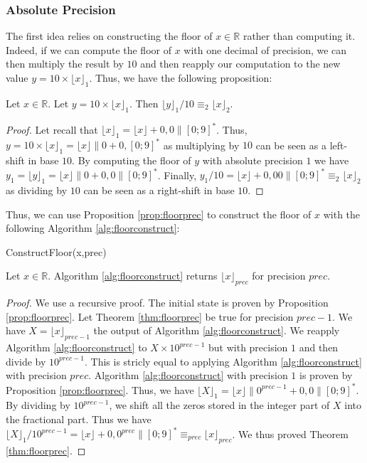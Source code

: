 \documentclass[runningheads]{llncs}
\begin{document}
\subsubsection{Absolute Precision} 
The first idea relies on constructing the floor of $x\in\mathbb{R}$ rather than computing it. Indeed, if we can compute the floor of $x$ with one decimal of precision, we can then multiply the result by $10$ and then reapply our computation to the new value $y=10\times \lfloor x\rfloor_1$. Thus, we have the following proposition:
\begin{proposition}\label{prop:floorprec}
  Let $x\in\mathbb{R}$. Let $y = 10\times\lfloor x\rfloor_1$. Then $\lfloor y \rfloor_1 /10 \equiv_2 \lfloor x \rfloor_2$.
\end{proposition}
\begin{proof}
  Let recall that $\lfloor x \rfloor_1 = \lfloor x \rfloor + 0,0 \|[0;9]^*$. Thus, $y=10\times\lfloor x \rfloor_1=\lfloor x\rfloor\|0+0,[0;9]^*$ as multiplying by $10$ can be seen as a left-shift in base $10$. By computing the floor of $y$ with absolute precision $1$ we have $y_1=\lfloor y \rfloor_1 = \lfloor x \rfloor\|0 + 0,0\|[0;9]^*$. Finally, $ y_1/10 = \lfloor x \rfloor + 0,00\|[0;9]^*\equiv_2 \lfloor x \rfloor_2$ as dividing by $10$ can be seen as a right-shift in base $10$.  
\end{proof}
Thus, we can use Proposition \ref{prop:floorprec} to construct the floor of $x$ with the following Algorithm \ref{alg:floorconstruct}:

\begin{algorithm}[H]
  \caption{ConstructFloor(x,prec)}
  \label{alg:floorconstruct}
\end{algorithm}

\begin{theorem}\label{thm:floorprec}
  Let $x\in\mathbb{R}$. Algorithm \ref{alg:floorconstruct} returns $\lfloor x \rfloor_{prec}$ for precision $prec$.
\end{theorem}
\begin{proof}
  We use a recursive proof. The initial state is proven by Proposition \ref{prop:floorprec}. Let Theorem \ref{thm:floorprec} be true for precision $prec-1$. We have $X=\lfloor x \rfloor_{prec-1}$ the output of Algorithm \ref{alg:floorconstruct}. We reapply Algorithm \ref{alg:floorconstruct} to $X\times 10^{prec-1}$ but with precision $1$ and then divide by $10^{prec-1}$. This is stricly equal to applying Algorithm \ref{alg:floorconstruct} with precision $prec$. Algorithm \ref{alg:floorconstruct} with precision $1$ is proven by Proposition \ref{prop:floorprec}. Thus, we have $\lfloor X \rfloor_1 = \lfloor x\rfloor \| {0}^{prec-1} + 0,0\|[0;9]^*$. By dividing by $10^{prec-1}$, we shift all the zeros stored in the integer part of $X$ into the fractional part. Thus we have $\lfloor X \rfloor_1 /10^{prec-1} = \lfloor x \rfloor + 0,{0}^{prec}\|[0;9]^* \equiv_{prec} \lfloor x \rfloor_{prec}$. We thus proved Theorem \ref{thm:floorprec}.
\end{proof}
\end{document}
